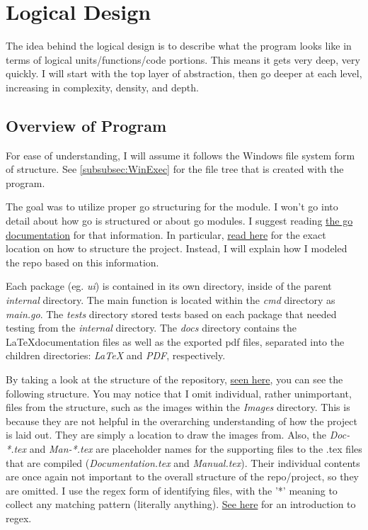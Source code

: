\section{Logical Design}
\label{sec:LogicalDesign}

The idea behind the logical design is to describe what the program
looks like in terms of logical units/functions/code portions. This
means it gets very deep, very quickly. I will start with the top
layer of abstraction, then go deeper at each level, increasing in
complexity, density, and depth.

\subsection{Overview of Program}

For ease of understanding, I will assume it follows the Windows file
system form of structure.
See \ref{subsubsec:WinExec} for the file tree that is created with the program.

The goal was to utilize proper go structuring for the module. I won't
go into detail about how go is structured or about go modules. I
suggest reading \href{https://go.dev/doc/}{the go documentation} for
that information. In particular,
\href{https://go.dev/doc/modules/layout}{read here} for the exact location
on how to structure the project. Instead, I will explain how I
modeled the repo based
on this information.

Each package (eg. \textit{ui}) is contained
in its own directory, inside of the parent \textit{internal} directory.
The main function is located within the \textit{cmd} directory as
\textit{main.go}.
The \textit{tests} directory stored tests based on each package that
needed testing from the \textit{internal} directory.
The \textit{docs} directory contains the \LaTeX documentation files
as well as the exported pdf files, separated into the children
directories: \textit{LaTeX} and \textit{PDF}, respectively.

By taking a look at the structure of the repository,
\href{https://github.com/EZRA-DVLPR/GameList}{seen here},
you can see the following structure. You may notice that I omit
individual, rather unimportant, files from the structure, such as the
images within the \textit{Images} directory. This is because they are
not helpful in the overarching understanding of how the project is
laid out. They are simply a location to draw the images from.
Also, the \textit{Doc-*.tex} and \textit{Man-*.tex} are placeholder
names for the supporting files
to the .tex files that are compiled
(\textit{Documentation.tex} and \textit{Manual.tex}). Their
individual contents are once again not important to the overall
structure of the repo/project, so they are omitted.
I use the regex form of identifying files, with the '*'
meaning to collect any matching pattern (literally anything).
\href{https://regexr.com/}{See here} for an introduction to regex.

